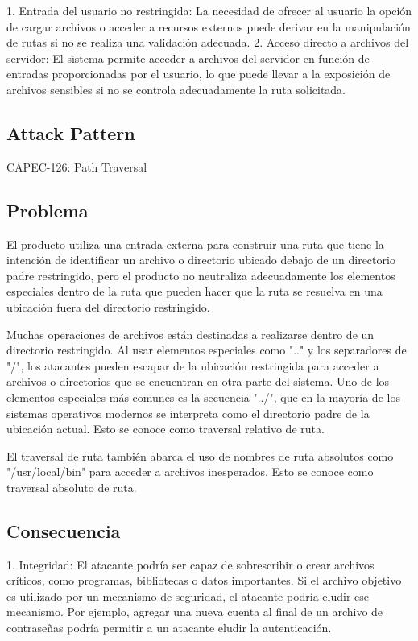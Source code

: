 1. Entrada del usuario no restringida: La necesidad de ofrecer al usuario la opción de cargar archivos o acceder a recursos externos puede derivar en la manipulación de rutas si no se realiza una validación adecuada.
2. Acceso directo a archivos del servidor: El sistema permite acceder a archivos del servidor en función de entradas proporcionadas por el usuario, lo que puede llevar a la exposición de archivos sensibles si no se controla adecuadamente la ruta solicitada.

\subsection{\textbf{Attack Pattern}}
CAPEC-126: Path Traversal

\subsection{\textbf{Problema}}

El producto utiliza una entrada externa para construir una ruta que tiene la intención de identificar un archivo o directorio ubicado debajo de un directorio padre restringido, pero el producto no neutraliza adecuadamente los elementos especiales dentro de la ruta que pueden hacer que la ruta se resuelva en una ubicación fuera del directorio restringido.

Muchas operaciones de archivos están destinadas a realizarse dentro de un directorio restringido. Al usar elementos especiales como ".." y los separadores de "/", los atacantes pueden escapar de la ubicación restringida para acceder a archivos o directorios que se encuentran en otra parte del sistema. Uno de los elementos especiales más comunes es la secuencia "../", que en la mayoría de los sistemas operativos modernos se interpreta como el directorio padre de la ubicación actual. Esto se conoce como traversal relativo de ruta.

El traversal de ruta también abarca el uso de nombres de ruta absolutos como "/usr/local/bin" para acceder a archivos inesperados. Esto se conoce como traversal absoluto de ruta. 

\subsection{\textbf{Consecuencia}}

1. Integridad: El atacante podría ser capaz de sobrescribir o crear archivos críticos, como programas, bibliotecas o datos importantes. Si el archivo objetivo es utilizado por un mecanismo de seguridad, el atacante podría eludir ese mecanismo. Por ejemplo, agregar una nueva cuenta al final de un archivo de contraseñas podría permitir a un atacante eludir la autenticación.

